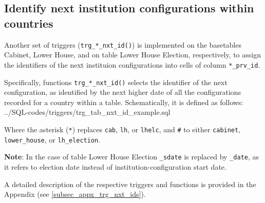 \subsection{Identify next institution configurations within countries}\label{subsec_trg_prv_ids}

Another set of triggers (\texttt{trg\_*\_nxt\_id()}) is implemented on the basetables Cabinet, Lower House, and on table Lower House Election, respectively, to assign the identifiers of the next instituion configurations into cells of column \texttt{*\_prv\_id}.

Specifically, functions \texttt{trg\_*\_nxt\_id()} selects the identifier of the next  configuration, as identified by the next higher date of all the configurations recorded for a country within a table.
Schematically, it is defined as follows:
%
{../SQL-codes/triggers/trg_tab_nxt_id_example.sql}

Where the asterisk (\texttt{*}) replaces \texttt{cab}, \texttt{lh}, or \texttt{lhelc}, and \texttt{\#} to either \texttt{cabinet}, \texttt{lower\_house}, or \texttt{lh\_election}.

{\bf Note}: In the case of table Lower House Election \texttt{\_sdate} is replaced by \texttt{\_date}, as it refers to election date instead of institution-configuration start date.

A detailed description of the respective triggers and functions is provided in the Appendix (see \ref{subsec_appx_trg_nxt_ids}).
